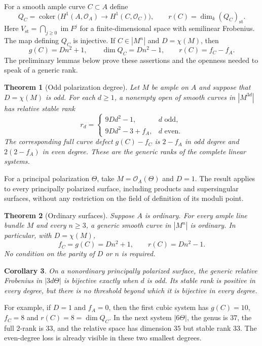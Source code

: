 \documentclass[11pt]{article}
\newtheorem{theorem}{Theorem}[section]
\newtheorem{corollary}[theorem]{Corollary}
\theoremstyle{definition}\newtheorem{definition}[theorem]{Definition}
\theoremstyle{remark}\newtheorem{remark}[theorem]{Remark}
\newcommand{\OO}{\mathcal O}
\begin{document}
For a smooth ample curve $C\subset A$ define
\[
 Q_C=\operatorname{coker}\bigl(H^1(A,\OO_A)\longrightarrow H^1(C,\OO_C)\bigr),
 \qquad r(C)=\dim_k(Q_C)_{\mathrm{st}}.
\]
Here $V_{\mathrm{st}}=\bigcap_{j\ge0}\operatorname{im}F^j$ for a finite-dimensional space with semilinear Frobenius. The map defining $Q_C$ is injective. If $C\in|M^n|$ and $D=\chi(M)$, then
\begin{equation}\label{eq:dimensions}
 g(C)=Dn^2+1,\qquad \dim Q_C=Dn^2-1,\qquad r(C)=f_C-f_A.
\end{equation}
The preliminary lemmas below prove these assertions and the openness needed to speak of a generic rank.

\begin{theorem}[Odd polarization degree]\label{thm:odd}
Let $M$ be ample on $A$ and suppose that $D=\chi(M)$ is odd. For each $d\ge1$, a nonempty open of smooth curves in $|M^{3d}|$ has relative stable rank
\[
 r_d=\begin{cases}
 9Dd^2-1,&d\text{ odd},\\
 9Dd^2-3+f_A,&d\text{ even}.
 \end{cases}
\]
The corresponding full curve defect $g(C)-f_C$ is $2-f_A$ in odd degree and $2(2-f_A)$ in even degree. These are the generic ranks of the complete linear systems.
\end{theorem}

For a principal polarization $\Theta$, take $M=\OO_A(\Theta)$ and $D=1$. The result applies to every principally polarized surface, including products and supersingular surfaces, without any restriction on the field of definition of its moduli point.

\begin{theorem}[Ordinary surfaces]\label{thm:ordinary}
Suppose $A$ is ordinary. For every ample line bundle $M$ and every $n\ge3$, a generic smooth curve in $|M^n|$ is ordinary. In particular, with $D=\chi(M)$,
\[
 f_C=g(C)=Dn^2+1,\qquad r(C)=Dn^2-1.
\]
No condition on the parity of $D$ or $n$ is required.
\end{theorem}

\begin{corollary}\label{cor:parity}
On a nonordinary principally polarized surface, the generic relative Frobenius in $|3d\Theta|$ is bijective exactly when $d$ is odd. Its stable rank is positive in every degree, but there is no threshold beyond which it is bijective in every degree.
\end{corollary}

For example, if $D=1$ and $f_A=0$, then the first cubic system has $g(C)=10$, $f_C=8$ and $r(C)=8=\dim Q_C$. In the next system $|6\Theta|$, the genus is $37$, the full $2$-rank is $33$, and the relative space has dimension $35$ but stable rank $33$. The even-degree loss is already visible in these two smallest degrees.
\end{document}
